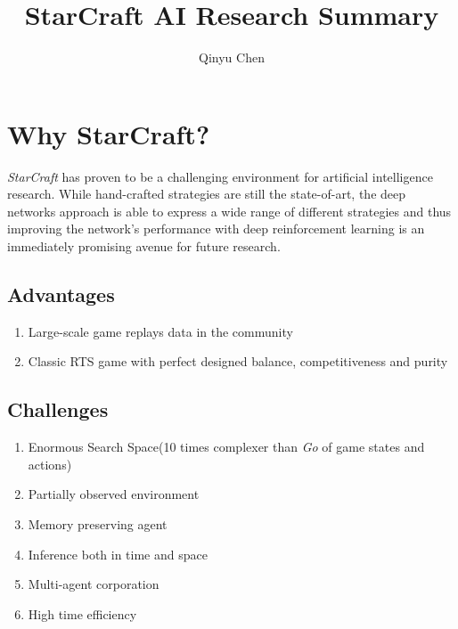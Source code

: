 \documentclass{llncs}
\begin{document}
\title{StarCraft AI Research Summary}
\titlerunning{}  %

\author{Qinyu Chen}
\authorrunning{} %

\tocauthor{}


\maketitle              %


\section{Why StarCraft?}
\emph{StarCraft} has proven to be a challenging environment for artificial intelligence research. While hand-crafted strategies are still the state-of-art, the deep networks approach is able to
express a wide range of different strategies and thus improving
the network’s performance with deep reinforcement
learning is an immediately promising avenue for future research.\cite{DBLP:journals/corr/JustesenR17}
\subsection{Advantages}
\begin{enumerate}
\item Large-scale game replays data in the community
\item Classic RTS game with perfect designed balance, competitiveness and purity
\end{enumerate}

\subsection{Challenges}
\begin{enumerate}
\item Enormous Search Space(10 times complexer than \emph{Go} of game states and actions)
\item Partially observed environment
\item Memory preserving agent
\item Inference both in time and space
\item Multi-agent corporation
\item High time efficiency
\end{enumerate}
\end{document}
